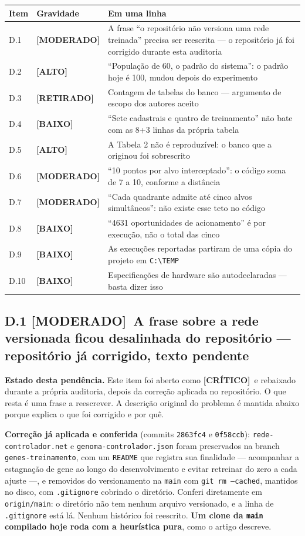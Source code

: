 \documentclass[11pt,a4paper]{article}
\newcommand{\critico}{\textbf{\color{red!60!black}[CRÍTICO]}}
\newcommand{\alto}{\textbf{\color{orange!70!black}[ALTO]}}
\newcommand{\moderado}{\textbf{\color{blue!50!black}[MODERADO]}}
\newcommand{\baixo}{\textbf{\color{gray}[BAIXO]}}
\begin{document}
\renewcommand{\arraystretch}{1.25}
\begin{longtable}{|p{0.9cm}|p{2.6cm}|p{11.6cm}|}
\hline
\textbf{Item} & \textbf{Gravidade} & \textbf{Em uma linha} \\
\hline
\endhead
D.1 & \moderado & A frase ``o repositório não versiona uma rede treinada'' precisa ser reescrita ---
o repositório já foi corrigido durante esta auditoria \\
\hline
D.2 & \alto & ``População de 60, o padrão do sistema'': o padrão hoje é 100, mudou depois do
experimento \\
\hline
D.3 & \textbf{[RETIRADO]} & Contagem de tabelas do banco --- argumento de escopo dos autores aceito \\
\hline
D.4 & \baixo & ``Sete cadastrais e quatro de treinamento'' não bate com as 8+3 linhas da própria
tabela \\
\hline
D.5 & \alto & A Tabela 2 não é reproduzível: o banco que a originou foi sobrescrito \\
\hline
D.6 & \moderado & ``10 pontos por alvo interceptado'': o código soma de 7 a 10, conforme a distância \\
\hline
D.7 & \moderado & ``Cada quadrante admite até cinco alvos simultâneos'': não existe esse teto no
código \\
\hline
D.8 & \baixo & ``4631 oportunidades de acionamento'' é por execução, não o total das cinco \\
\hline
D.9 & \baixo & As execuções reportadas partiram de uma cópia do projeto em
\texttt{C:\textbackslash TEMP} \\
\hline
D.10 & \baixo & Especificações de hardware são autodeclaradas --- basta dizer isso \\
\hline
\end{longtable}

\subsection*{D.1 \moderado\ A frase sobre a rede versionada ficou desalinhada do repositório --- repositório já corrigido, texto pendente}

\textbf{Estado desta pendência.} Este item foi aberto como \critico\ e rebaixado durante a própria
auditoria, depois da correção aplicada no repositório. O que resta é uma frase a reescrever. A
descrição original do problema é mantida abaixo porque explica o que foi corrigido e por quê.

\textbf{Correção já aplicada e conferida} (commits \texttt{2863fc4} e \texttt{0f58ccb}):
\texttt{rede-controlador.net} e \texttt{genoma-controlador.json} foram preservados na branch
\texttt{genes-treinamento}, com um \texttt{README} que registra sua finalidade --- acompanhar a
estagnação de gene ao longo do desenvolvimento e evitar retreinar do zero a cada ajuste ---, e
removidos do versionamento na \texttt{main} com \texttt{git rm --cached}, mantidos no disco, com
\texttt{.gitignore} cobrindo o diretório. Conferi diretamente em \texttt{origin/main}: o diretório
não tem nenhum arquivo versionado, e a linha de \texttt{.gitignore} está lá. Nenhum histórico foi
reescrito. \textbf{Um clone da \texttt{main} compilado hoje roda com a heurística pura}, como o
artigo descreve.
\end{document}
